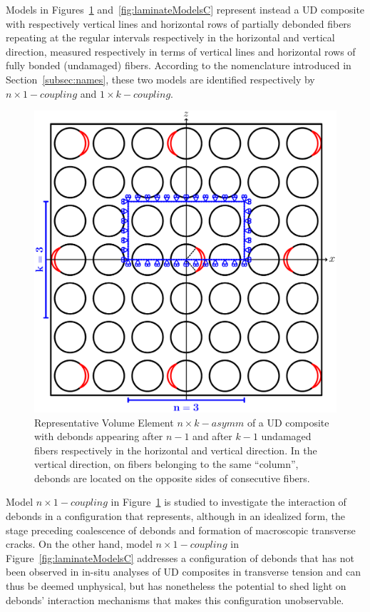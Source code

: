 \documentclass[smallextended]{svjour3}       %
\begin{document}
Models in Figures~\ref{fig:laminateModelsB} and~\ref{fig:laminateModelsC} represent instead a UD composite with respectively vertical lines and horizontal rows of partially debonded fibers repeating at the regular intervals respectively in the horizontal and vertical direction, measured respectively in terms of vertical lines and horizontal rows of fully bonded (undamaged) fibers. According to the nomenclature introduced in Section~\ref{subsec:names}, these two models are identified respectively by $n\times 1-coupling$ and $1\times k-coupling$.

\begin{figure}[!h]
\centering
\includegraphics[width=\textwidth]{asymm.pdf}
\caption{Representative Volume Element $n\times k-asymm$  of a UD composite with debonds appearing after $n-1$ and after $k-1$ undamaged fibers respectively in the horizontal and vertical direction. In the vertical direction, on fibers belonging to the same ``column'', debonds are located on the opposite sides of consecutive fibers.}\label{fig:laminateModelsB}
\end{figure}

Model $n\times 1-coupling$ in Figure~\ref{fig:laminateModelsB} is studied to investigate the interaction of debonds in a configuration that represents, although in an idealized form, the stage preceding coalescence of debonds and formation of macroscopic transverse cracks. 
On the other hand, model $n\times 1-coupling$ in Figure~\ref{fig:laminateModelsC} addresses a configuration of debonds that has not been observed in in-situ analyses of UD composites in transverse tension and can thus be deemed unphysical, but has nonetheless the potential to shed light on debonds' interaction mechanisms that makes this configuration unobservable.
\end{document}
